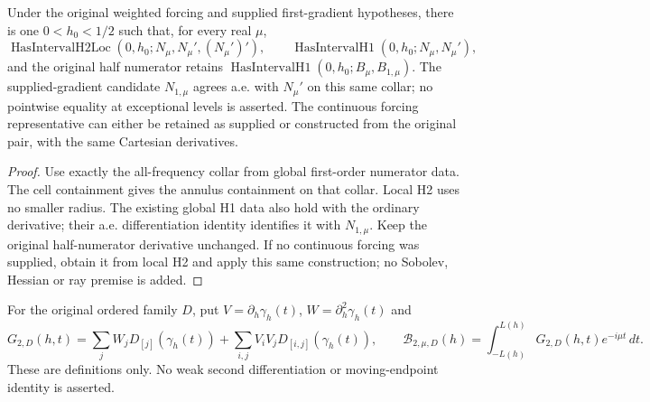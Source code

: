 \begin{lemma}
\label{lem:weighted-numerator-local-h2}
\leanok
Under the original weighted forcing and supplied first-gradient hypotheses,
there is one $0<h_0<1/2$ such that, for every real $\mu$,
\[
 \operatorname{HasIntervalH2Loc}(0,h_0;N_\mu,N_\mu',(N_\mu')'),\qquad
 \operatorname{HasIntervalH1}(0,h_0;N_\mu,N_\mu'),
\]
and the original half numerator retains
$\operatorname{HasIntervalH1}(0,h_0;B_\mu,B_{1,\mu})$.
The supplied-gradient candidate $N_{1,\mu}$ agrees a.e. with $N_\mu'$
on this same collar; no pointwise equality at exceptional levels is asserted.
The continuous forcing representative can either be retained as supplied or
constructed from the original pair, with the same Cartesian derivatives.
\end{lemma}

\begin{proof}
\leanok
Use exactly the all-frequency collar from global first-order numerator data.
The cell containment gives the annulus containment on that collar.
Local H2 uses no smaller radius.
The existing global H1 data also hold with the ordinary derivative;
their a.e. differentiation identity identifies it with $N_{1,\mu}$.
Keep the original half-numerator derivative unchanged.
If no continuous forcing was supplied, obtain it from local H2 and apply this
same construction; no Sobolev, Hessian or ray premise is added.
\end{proof}

\begin{definition}
\label{def:second-level-bulk}
\leanok
For the original ordered family $D$, put $V=\partial_h\gamma_h(t)$,
$W=\partial_h^2\gamma_h(t)$ and
\[
 G_{2,D}(h,t)=
 \sum_j W_jD_{[j]}(\gamma_h(t))+
 \sum_{i,j}V_iV_jD_{[i,j]}(\gamma_h(t)),\qquad
 \mathcal B_{2,\mu,D}(h)=\int_{-L(h)}^{L(h)}G_{2,D}(h,t)e^{-i\mu t}\,dt.
\]
These are definitions only. No weak second differentiation or
moving-endpoint identity is asserted.
\end{definition}

